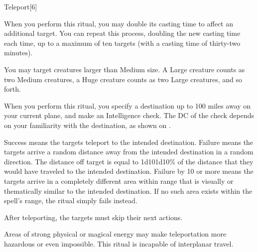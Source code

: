 \begin{spellsection}{Teleport}[6]
    \begin{spellheader}
    \end{spellheader}
    \begin{spellcontent}
        \begin{spelltargetinginfo}
        \end{spelltargetinginfo}
        \begin{spelleffects}

            \spellspecial When you perform this ritual, you may double its casting time to affect an additional target. You can repeat this process, doubling the new casting time each time, up to a maximum of ten targets (with a casting time of thirty-two minutes).

            You may target creatures larger than Medium size. A Large creature counts as two Medium creatures, a Huge creature counts as two Large creatures, and so forth.

            \spelleffect When you perform this ritual, you specify a destination up to 100 miles away on your current plane, and make an Intelligence check. The DC of the check depends on your familiarity with the destination, as shown on .

            Success means the targets teleport to the intended destination. Failure means the targets arrive a random distance away from the intended destination in a random direction. The distance off target is equal to 1d10\mult1d10\% of the distance that they would have traveled to the intended destination. Failure by 10 or more means the targets arrive in a completely different area within range that is visually or thematically similar to the intended destination. If no such area exists within the spell's range, the ritual simply fails instead.

            After teleporting, the targets must skip their next actions.

        \end{spelleffects}
    \end{spellcontent}
    \begin{spellfooter}
        \spellnotes Areas of strong physical or magical energy may make teleportation more hazardous or even impossible. This ritual is incapable of interplanar travel.
    \end{spellfooter}
\end{spellsection}

